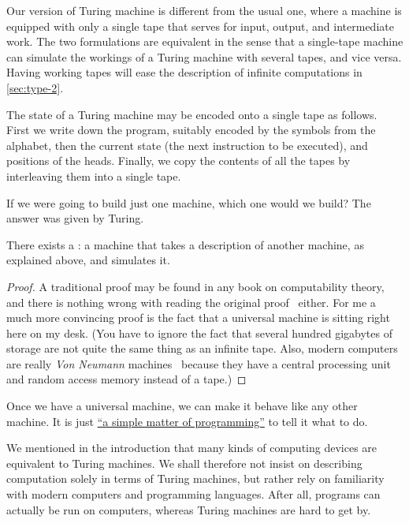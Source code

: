 Our version of Turing machine is different from the usual one, where a
machine is equipped with only a single tape that serves for input,
output, and intermediate work. The two formulations are equivalent in
the sense that a single-tape machine can simulate the workings of a
Turing machine with several tapes, and vice versa. Having working tapes will
ease the description of infinite computations in \cref{sec:type-2}.

The state of a Turing machine may be encoded onto a single tape as
follows. First we write down the program, suitably encoded by the
symbols from the alphabet, then the current state (the next
instruction to be executed), and positions of the heads. Finally, we
copy the contents of all the tapes by interleaving them into a single
tape.

If we were going to build just one machine, which one would we build?
The answer was given by Turing.

\begin{theorem}[Turing]
  \label{thm:universal-machine}
  There exists a : a machine that takes a
  description of another machine, as explained above, and simulates
  it.
\end{theorem}

\begin{proof}
  A traditional proof may be found in any book on computability
  theory, and there is nothing wrong with reading the original
  proof~ either.
  For me a much more convincing proof is the fact that a universal
  machine is sitting right here on my desk. (You have to
    ignore the fact that several hundred gigabytes of storage are not
    quite the same thing as an infinite tape. Also, modern computers
    are really \emph{Von Neumann}
    machines~ because
    they have a central processing unit and random access memory
    instead of a tape.)
\end{proof}

Once we have a universal machine, we can make it behave like any other
machine. It is just
\href{http://www.catb.org/jargon/html/S/SMOP.html}{``a simple matter
  of programming''} to tell it what to do.

We mentioned in the introduction that many kinds of computing devices
are equivalent to Turing machines. We shall therefore not insist on
describing computation solely in terms of Turing machines, but rather
rely on familiarity with modern computers and programming languages.
After all, programs can actually be run on computers, whereas Turing
machines are hard to get by.


